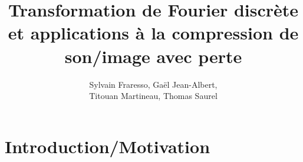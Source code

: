 \documentclass{article}
\title{Transformation de Fourier discrète et applications à la compression de son/image avec perte}
\author{Sylvain Fraresso, Gaël Jean-Albert, \\Titouan Martineau, Thomas Saurel}
\begin{document}
\maketitle
\newpage
\tableofcontents
\newpage

\section{Introduction/Motivation}

\end{document}

